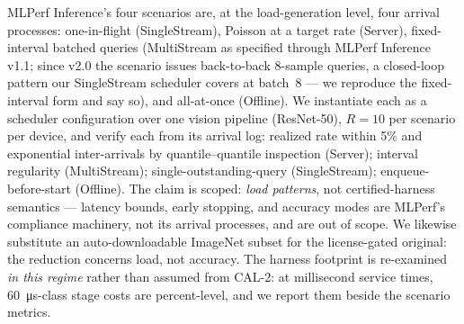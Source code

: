 MLPerf Inference's four scenarios are, at the load-generation level, four
arrival processes: one-in-flight (SingleStream), Poisson at a target rate
(Server), fixed-interval batched queries (MultiStream as specified through
MLPerf Inference v1.1; since v2.0 the scenario issues back-to-back
8-sample queries, a closed-loop pattern our SingleStream scheduler covers
at batch~8 --- we reproduce the fixed-interval form and say so), and
all-at-once (Offline). We instantiate each as a \sysname{} scheduler configuration over
one vision pipeline (ResNet-50), $R{=}10$ per scenario per device, and
verify each from its arrival log: realized rate within 5\% and exponential
inter-arrivals by quantile--quantile inspection (Server); interval
regularity (MultiStream); single-outstanding-query (SingleStream);
enqueue-before-start (Offline). The claim is scoped: \emph{load patterns},
not certified-harness semantics --- latency bounds, early stopping, and
accuracy modes are MLPerf's compliance machinery, not its arrival
processes, and are out of scope. We likewise substitute an
auto-downloadable ImageNet subset for the license-gated original: the
reduction concerns load, not accuracy. The harness footprint is
re-examined \emph{in this regime} rather than assumed from CAL-2: at
millisecond service times, \SI{60}{\micro\second}-class stage costs are
percent-level, and we report them beside the scenario metrics.

\begin{table}[t]\centering\small
\caption{Knob table for the topology study (M2~Pro / GB10). Every value
derives from a committed rule with pilot inputs; verification outcomes and
the remaining experiments' tables ship in the artifact. Rates in
queries/s.}
\label{tab:knobs-topology}
\end{table}

